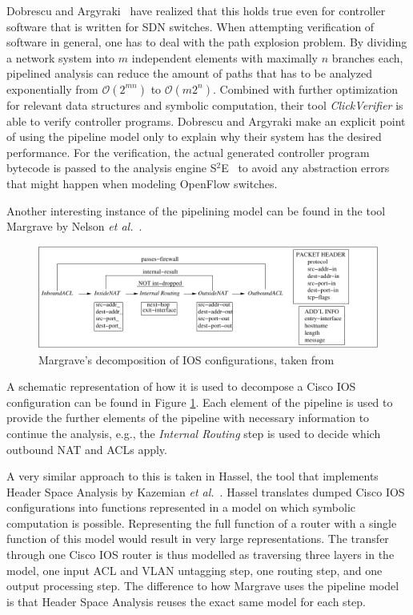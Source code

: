 Dobrescu and Argyraki~\cite{dobrescu2014software} have realized that this holds true even for controller software that is written for SDN switches.
When attempting verification of software in general, one has to deal with the path explosion problem.
By dividing a network system into $m$ independent elements with maximally $n$ branches each, pipelined analysis can reduce the amount of paths that has to be analyzed exponentially from $\mathcal{O}\left(2^{mn}\right)$ to $\mathcal{O}\left(m2^n\right)$.
Combined with further optimization for relevant data structures and symbolic computation, their tool \emph{ClickVerifier} is able to verify controller programs.
Dobrescu and Argyraki make an explicit point of using the pipeline model only to explain why their system has the desired performance.
For the verification, the actual generated controller program bytecode is passed to the analysis engine S$^2$E~\cite{chipounov2009selective} to avoid any abstraction errors that might happen when modeling OpenFlow switches.

Another interesting instance of the pipelining model can be found in the tool Margrave by Nelson \emph{et al.}~\cite{nelson2010margrave}.
\begin{figure}
	\includegraphics{fig/pipeline.pdf}
	\caption{Margrave's decomposition of IOS configurations, taken from \cite{nelson2010margrave}}
	\label{fig:margravedecomp}
\end{figure}
A schematic representation of how it is used to decompose a Cisco IOS configuration can be found in Figure \ref{fig:margravedecomp}.
Each element of the pipeline is used to provide the further elements of the pipeline with necessary information to continue the analysis, e.g., the \emph{Internal Routing} step is used to decide which outbound NAT and ACLs apply.

A very similar approach to this is taken in Hassel, the tool that implements Header Space Analysis by Kazemian \emph{et al.}~\cite{kazemian12header}.
Hassel translates dumped Cisco IOS configurations into functions represented in a model on which symbolic computation is possible.
Representing the full function of a router with a single function of this model would result in very large representations.
The transfer through one Cisco IOS router is thus modelled as traversing three layers in the model, one input ACL and VLAN untagging step, one routing step, and one output processing step.
The difference to how Margrave uses the pipeline model is that Header Space Analysis reuses the exact same model for each step.

